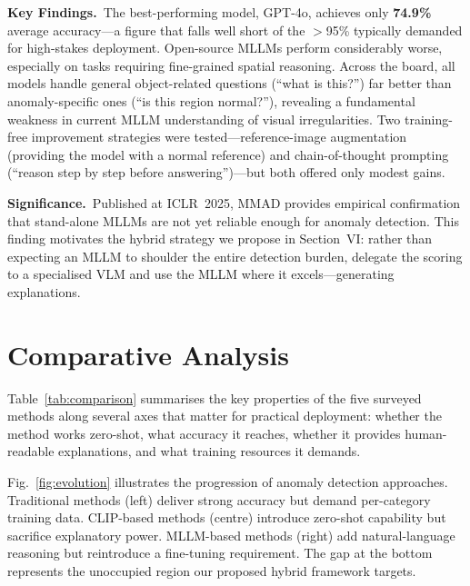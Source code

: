 \documentclass[conference]{IEEEtran}
\begin{document}
\textbf{Key Findings.}\ The best-performing model, GPT-4o, achieves only \textbf{74.9\%} average accuracy---a figure that falls well short of the $>$95\% typically demanded for high-stakes deployment. Open-source MLLMs perform considerably worse, especially on tasks requiring fine-grained spatial reasoning. Across the board, all models handle general object-related questions (``what is this?'') far better than anomaly-specific ones (``is this region normal?''), revealing a fundamental weakness in current MLLM understanding of visual irregularities. Two training-free improvement strategies were tested---reference-image augmentation (providing the model with a normal reference) and chain-of-thought prompting (``reason step by step before answering'')---but both offered only modest gains.

\textbf{Significance.}\ Published at ICLR~2025, MMAD provides empirical confirmation that stand-alone MLLMs are not yet reliable enough for anomaly detection. This finding motivates the hybrid strategy we propose in Section~VI: rather than expecting an MLLM to shoulder the entire detection burden, delegate the scoring to a specialised VLM and use the MLLM where it excels---generating explanations.

\section{Comparative Analysis}

Table~\ref{tab:comparison} summarises the key properties of the five surveyed methods along several axes that matter for practical deployment: whether the method works zero-shot, what accuracy it reaches, whether it provides human-readable explanations, and what training resources it demands.

Fig.~\ref{fig:evolution} illustrates the progression of anomaly detection approaches. Traditional methods (left) deliver strong accuracy but demand per-category training data. CLIP-based methods (centre) introduce zero-shot capability but sacrifice explanatory power. MLLM-based methods (right) add natural-language reasoning but reintroduce a fine-tuning requirement. The gap at the bottom represents the unoccupied region our proposed hybrid framework targets.
\end{document}
